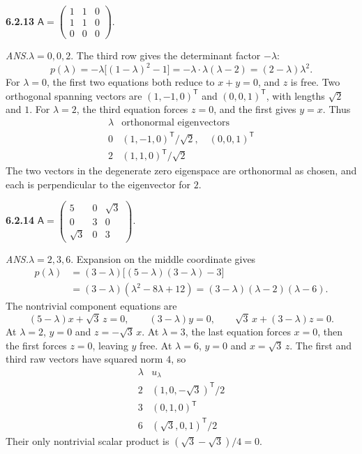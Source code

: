 \par\bigskip
\noindent\textbf{6.2.13}\quad
$\mathsf{A}=\begin{pmatrix}1&1&0\\1&1&0\\0&0&0\end{pmatrix}$.
\par\nobreak\hfill\emph{ANS.}\enspace $\lambda=0,0,2$.
\solution
The third row gives the determinant factor $-\lambda$:
\[
p(\lambda)=-\lambda\bigl[(1-\lambda)^2-1\bigr]
=-\lambda\cdot\lambda(\lambda-2)
=(2-\lambda)\lambda^2.
\]
For $\lambda=0$, the first two equations both reduce to $x+y=0$,
and $z$ is free. Two orthogonal spanning vectors are
$(1,-1,0)^{\mathsf T}$ and $(0,0,1)^{\mathsf T}$, with lengths
$\sqrt2$ and $1$. For $\lambda=2$, the third equation forces $z=0$,
and the first gives $y=x$. Thus
\[
\boxed{\begin{array}{c|c}
\lambda&\text{orthonormal eigenvectors}\\\hline
0&(1,-1,0)^{\mathsf T}/\sqrt2,\quad(0,0,1)^{\mathsf T}\\
2&(1,1,0)^{\mathsf T}/\sqrt2
\end{array}}
\]
The two vectors in the degenerate zero eigenspace are orthonormal as
chosen, and each is perpendicular to the eigenvector for $2$.

\par\bigskip
\noindent\textbf{6.2.14}\quad
$\mathsf{A}=\begin{pmatrix}5&0&\sqrt{3}\\0&3&0\\\sqrt{3}&0&3\end{pmatrix}$.
\par\nobreak\hfill\emph{ANS.}\enspace $\lambda=2,3,6$.
\solution
Expansion on the middle coordinate gives
\begin{align*}
p(\lambda)
&=(3-\lambda)\bigl[(5-\lambda)(3-\lambda)-3\bigr]\\
&=(3-\lambda)(\lambda^2-8\lambda+12)
=(3-\lambda)(\lambda-2)(\lambda-6).
\end{align*}
The nontrivial component equations are
\[
(5-\lambda)x+\sqrt3\,z=0,\qquad
(3-\lambda)y=0,\qquad
\sqrt3\,x+(3-\lambda)z=0.
\]
At $\lambda=2$, $y=0$ and $z=-\sqrt3\,x$.
At $\lambda=3$, the last equation forces $x=0$, then the first forces
$z=0$, leaving $y$ free.
At $\lambda=6$, $y=0$ and $x=\sqrt3\,z$.
The first and third raw vectors have squared norm $4$, so
\[
\boxed{\begin{array}{c|c}
\lambda&u_\lambda\\\hline
2&(1,0,-\sqrt3)^{\mathsf T}/2\\
3&(0,1,0)^{\mathsf T}\\
6&(\sqrt3,0,1)^{\mathsf T}/2
\end{array}}
\]
Their only nontrivial scalar product is $(\sqrt3-\sqrt3)/4=0$.

